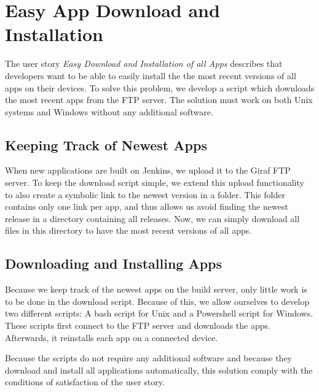 \chapter{Easy App Download and Installation}
The user story \emph{Easy Download and Installation of all Apps} describes that developers want to be able to easily install the the most recent versions of all apps on their devices. To solve this problem, we develop a script which downloads the most recent apps from the FTP server. The solution must work on both Unix systems and Windows without any additional software.

\section{Keeping Track of Newest Apps}
When new applications are built on Jenkins, we upload it to the Giraf FTP server. To keep the download script simple, we extend this upload functionality to also create a symbolic link to the newest version in a  folder. This folder contains only one link per app, and thus allows us avoid finding the newest release in a directory containing all releases. Now, we can simply download all files in this directory to have the most recent versions of all apps.

\section{Downloading and Installing Apps}
Because we keep track of the newest apps on the build server, only little work is to be done in the download script. Because of this, we allow ourselves to develop two different scripts: A bash script for Unix and a Powershell script for Windows. These scripts first connect to the FTP server and downloads the apps. Afterwards, it reinstalls each app on a connected device.

Because the scripts do not require any additional software and because they download and install all applications automatically, this solution comply with the conditions of satisfaction of the user story.

